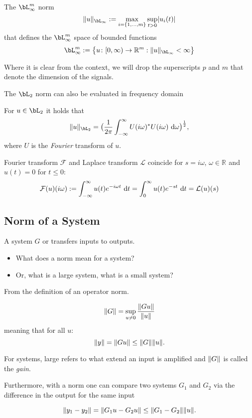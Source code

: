 The $\bL_\infty^m$ norm 
$$ \norm{u}_{\bL_\infty} := \max_{i=\{1, \dotsc, m\}} \sup_{t>0}\abs{u_i(t)} $$ 
that defines the $\bL_\infty^m$ space of bounded functions
$$\bL_\infty^m:=\bigl \{ u \colon [0, \infty) \to \mathbb R^{m} : \norm{u}_{\bL_\infty}<\infty \bigr \} $$

Where it is clear from the context, we will drop the superscripts $p$ and $m$ that denote the dimension of the signals.

The $\bL_2 $ norm can also be evaluated in frequency domain

\begin{theorem}
	For $u \in \bL_2 $ it holds that 
	\begin{equation*}
		\norm{u}_{\bL_2 } = \bigl ( \frac{1}{2\pi} \int_{-\infty}^{\infty} U(i\omega)^*U(i\omega) \inva \omega \bigr)^{\frac 12},
	\end{equation*}
	where $U$ is the \emph{Fourier} transform of $u$.
\end{theorem}

\begin{footnotesize}
	Fourier transform $\mathcal F$ and Laplace transform $\mathcal L$ coincide for $s=i\omega$, $\omega \in \mathbb R^{}$ and  $u(t)=0$ for $t\leq 0$:
	$$
	\mathcal F(u)(i\omega) := \int_{-\infty}^{\infty} u(t) e^{-i\omega t}\text{~\textup{d}} t = \int_0^{\infty} u(t)e^{-st}\text{~\textup{d}} t = \mathcal L(u)(s)
	$$
\end{footnotesize}
\subsection{Norm of a System}
A system $G$ or \abcdsys transfers inputs to outputs.
\begin{itemize}
	\item What does a norm mean for a system?
	\item Or, what is a large system, what is a small system?
\end{itemize}
From the definition of an operator norm.

$$
\lVert G \rVert = \sup_{u\neq 0}\frac{\lVert Gu \rVert}{\lVert u \rVert} 
$$
meaning that for all $u$:
$$
\lVert y \rVert=\lVert Gu \rVert\leq \lVert G \rVert\lVert u \rVert.
$$

For systems, large refers to what extend an input is amplified and $\lVert G \rVert$ is called the \emph{gain}.

Furthermore, with a norm one can compare two systems $G_1$ and $G_2$ via the difference in the output for the same input

$$\lVert y_1 - y_2  \rVert=\lVert G_1u - G_2u \rVert\leq \lVert G_1-G_2 \rVert\lVert u \rVert.$$


